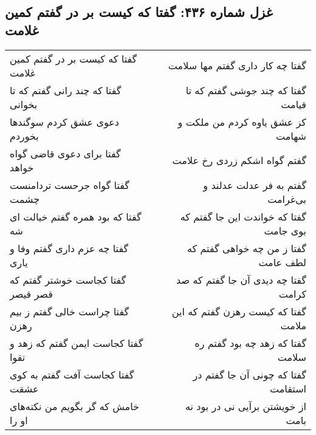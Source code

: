 \begin{center}
\section*{غزل شماره ۴۳۶: گفتا که کیست بر در گفتم کمین غلامت}
\label{sec:0436}
\begin{longtable}{l p{0.5cm} r}
گفتا که کیست بر در گفتم کمین غلامت
&&
گفتا چه کار داری گفتم مها سلامت
\\
گفتا که چند رانی گفتم که تا بخوانی
&&
گفتا که چند جوشی گفتم که تا قیامت
\\
دعوی عشق کردم سوگندها بخوردم
&&
کز عشق یاوه کردم من ملکت و شهامت
\\
گفتا برای دعوی قاضی گواه خواهد
&&
گفتم گواه اشکم زردی رخ علامت
\\
گفتا گواه جرحست تردامنست چشمت
&&
گفتم به فر عدلت عدلند و بی‌غرامت
\\
گفتا که بود همره گفتم خیالت ای شه
&&
گفتا که خواندت این جا گفتم که بوی جامت
\\
گفتا چه عزم داری گفتم وفا و یاری
&&
گفتا ز من چه خواهی گفتم که لطف عامت
\\
گفتا کجاست خوشتر گفتم که قصر قیصر
&&
گفتا چه دیدی آن جا گفتم که صد کرامت
\\
گفتا چراست خالی گفتم ز بیم رهزن
&&
گفتا که کیست رهزن گفتم که این ملامت
\\
گفتا کجاست ایمن گفتم که زهد و تقوا
&&
گفتا که زهد چه بود گفتم ره سلامت
\\
گفتا کجاست آفت گفتم به کوی عشقت
&&
گفتا که چونی آن جا گفتم در استقامت
\\
خامش که گر بگویم من نکته‌های او را
&&
از خویشتن برآیی نی در بود نه بامت
\\
\end{longtable}
\end{center}
